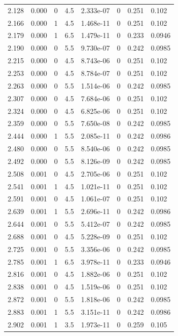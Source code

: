 \documentclass[preview]{standalone}
\begin{document}
{{{\begin{tabular}{L{1.2cm}C{1.2cm} C{0.3cm}C{0.5cm} C{1.4cm}C{1.4cm} C{1.4cm}C{1.4cm}}
  2.128  &  0.000  & 0     & 4.5 &  2.333e-07  & 0  & 0.251 &  0.102   \\ 
  2.166  &  0.000  & 1     & 4.5 &  1.468e-11  & 0  & 0.251 &  0.102   \\ 
  2.179  &  0.000  & 1     & 6.5 &  1.479e-11  & 0  & 0.233 &  0.0946   \\ 
  2.190  &  0.000  & 0     & 5.5 &  9.730e-07  & 0  & 0.242 &  0.0985   \\ 
  2.215  &  0.000  & 0     & 4.5 &  8.743e-06  & 0  & 0.251 &  0.102   \\ 
  2.253  &  0.000  & 0     & 4.5 &  8.784e-07  & 0  & 0.251 &  0.102   \\ 
  2.263  &  0.000  & 0     & 5.5 &  1.514e-06  & 0  & 0.242 &  0.0985   \\ 
  2.307  &  0.000  & 0     & 4.5 &  7.684e-06  & 0  & 0.251 &  0.102   \\ 
  2.324  &  0.000  & 0     & 4.5 &  6.825e-06  & 0  & 0.251 &  0.102   \\ 
  2.359  &  0.000  & 0     & 5.5 &  7.650e-08  & 0  & 0.242 &  0.0985   \\ 
  2.444  &  0.000  & 1     & 5.5 &  2.085e-11  & 0  & 0.242 &  0.0986   \\ 
  2.480  &  0.000  & 0     & 5.5 &  8.540e-06  & 0  & 0.242 &  0.0985   \\ 
  2.492  &  0.000  & 0     & 5.5 &  8.126e-09  & 0  & 0.242 &  0.0985   \\ 
  2.508  &  0.001  & 0     & 4.5 &  2.705e-06  & 0  & 0.251 &  0.102   \\ 
  2.541  &  0.001  & 1     & 4.5 &  1.021e-11  & 0  & 0.251 &  0.102   \\ 
  2.591  &  0.001  & 0     & 4.5 &  1.061e-07  & 0  & 0.251 &  0.102   \\ 
  2.639  &  0.001  & 1     & 5.5 &  2.696e-11  & 0  & 0.242 &  0.0986   \\ 
  2.644  &  0.001  & 0     & 5.5 &  5.412e-07  & 0  & 0.242 &  0.0985   \\ 
  2.688  &  0.001  & 0     & 4.5 &  5.228e-09  & 0  & 0.251 &  0.102   \\ 
  2.725  &  0.001  & 0     & 5.5 &  3.356e-06  & 0  & 0.242 &  0.0985   \\ 
  2.785  &  0.001  & 1     & 6.5 &  3.978e-11  & 0  & 0.233 &  0.0946   \\ 
  2.816  &  0.001  & 0     & 4.5 &  1.882e-06  & 0  & 0.251 &  0.102   \\ 
  2.838  &  0.001  & 0     & 4.5 &  1.519e-06  & 0  & 0.251 &  0.102   \\ 
  2.872  &  0.001  & 0     & 5.5 &  1.818e-06  & 0  & 0.242 &  0.0985   \\ 
  2.883  &  0.001  & 1     & 5.5 &  3.151e-11  & 0  & 0.242 &  0.0986   \\ 
  2.902  &  0.001  & 1     & 3.5 &  1.973e-11  & 0  & 0.259 &  0.105   \\ 
\hline 
\end{tabular} 

}}}
\end{document}
